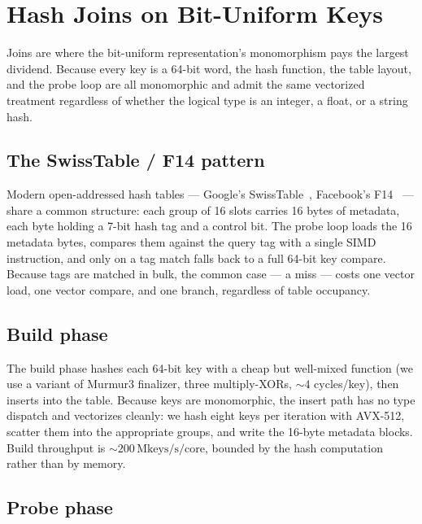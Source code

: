 \documentclass[10pt]{article}
\theoremstyle{definition}
\begin{document}
\section{Hash Joins on Bit-Uniform Keys}

Joins are where the bit-uniform representation's monomorphism pays the largest dividend. Because every key is a 64-bit word, the hash function, the table layout, and the probe loop are all monomorphic and admit the same vectorized treatment regardless of whether the logical type is an integer, a float, or a string hash.

\subsection{The SwissTable / F14 pattern}

Modern open-addressed hash tables --- Google's SwissTable~\citep{swisstable}, Facebook's F14~\citep{folly_f14} --- share a common structure: each group of 16 slots carries 16 bytes of metadata, each byte holding a 7-bit hash tag and a control bit. The probe loop loads the 16 metadata bytes, compares them against the query tag with a single SIMD instruction, and only on a tag match falls back to a full 64-bit key compare. Because tags are matched in bulk, the common case --- a miss --- costs one vector load, one vector compare, and one branch, regardless of table occupancy.

\subsection{Build phase}

The build phase hashes each 64-bit key with a cheap but well-mixed function (we use a variant of Murmur3 finalizer, three multiply-XORs, $\sim\!4$ cycles/key), then inserts into the table. Because keys are monomorphic, the insert path has no type dispatch and vectorizes cleanly: we hash eight keys per iteration with AVX-512, scatter them into the appropriate groups, and write the 16-byte metadata blocks. Build throughput is $\sim\!200\,\text{Mkeys/s/core}$, bounded by the hash computation rather than by memory.

\subsection{Probe phase}
\end{document}
